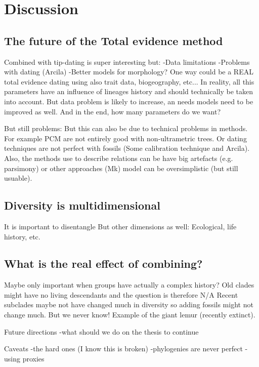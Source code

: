 \chapter{Discussion}
\label{chap:discussion}


\section{The future of the Total evidence method}
Combined with tip-dating is super interesting but:
-Data limitations
-Problems with dating (Arcila)
-Better models for morphology?
One way could be a REAL total evidence dating using also trait data, biogeography, etc...
In reality, all this parameters have an influence of lineages history and should technically be taken into account.
But data problem is likely to increase, an needs models need to be improved as well.
And in the end, how many parameters do we want?

But still problems:
But this can also be due to technical problems in methods.
For example PCM are not entirely good with non-ultrametric trees.
Or dating techniques are not perfect with fossils (Some calibration technique and Arcila).
Also, the methods use to describe relations can be have big artefacts (e.g. parsimony) or other approaches (Mk) model can be oversimplistic (but still usuable).

\section{Diversity is multidimensional}
It is important to disentangle
But other dimensions as well: Ecological, life history, etc.

\section{What is the real effect of combining?}
Maybe only important when groups have actually a complex history?
Old clades might have no living descendants and the question is therefore N/A
Recent subclades maybe not have changed much in diversity so adding fossils might not change much.
But we never know! Example of the giant lemur (recently extinct).

Future directions
-what should we do on the thesis to continue

Caveats
-the hard ones (I know this is broken)
-phylogenies are never perfect
-using proxies